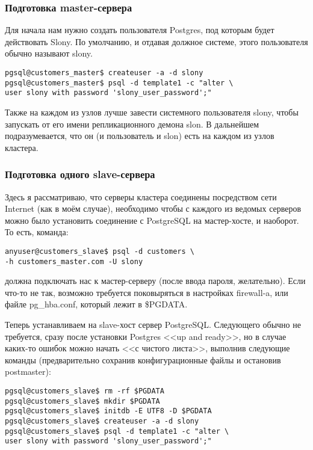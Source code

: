 \subsubsection{Подготовка master-сервера}
Для начала нам нужно создать пользователя Postgres, под которым будет действовать Slony. 
По умолчанию, и отдавая должное системе, этого пользователя обычно называют slony.
\begin{lstlisting}[label=lst:slony2,caption=Подготовка master-сервера]
pgsql@customers_master$ createuser -a -d slony
pgsql@customers_master$ psql -d template1 -c "alter \
user slony with password 'slony_user_password';"
\end{lstlisting}

Также на каждом из узлов лучше завести системного пользователя slony, чтобы запускать от его имени 
репликационного демона slon. В дальнейшем подразумевается, что он (и пользователь и slon) есть на 
каждом из узлов кластера. 

\subsubsection{Подготовка одного slave-сервера}
Здесь я рассматриваю, что серверы кластера соединены посредством сети Internet (как в моём случае), необходимо 
чтобы с каждого из ведомых серверов можно было установить соединение с PostgreSQL на мастер-хосте, и наоборот. 
То есть, команда:
\begin{lstlisting}[label=lst:slony3,caption=Подготовка одного slave-сервера]
anyuser@customers_slave$ psql -d customers \
-h customers_master.com -U slony
\end{lstlisting}

должна подключать нас к мастер-серверу (после ввода пароля, желательно). Если что-то не так, возможно требуется 
поковыряться в настройках firewall-a, или файле pg\_hba.conf, который лежит в \$PGDATA.

Теперь устанавливаем на slave-хост сервер PostgreSQL. Следующего обычно не требуется, сразу после установки Postgres 
<<up and ready>>, но в случае каких-то ошибок можно начать <<с чистого листа>>, выполнив следующие команды 
(предварительно сохранив конфигурационные файлы и остановив postmaster):
\begin{lstlisting}[label=lst:slony4,caption=Подготовка одного slave-сервера]
pgsql@customers_slave$ rm -rf $PGDATA
pgsql@customers_slave$ mkdir $PGDATA
pgsql@customers_slave$ initdb -E UTF8 -D $PGDATA
pgsql@customers_slave$ createuser -a -d slony
pgsql@customers_slave$ psql -d template1 -c "alter \
user slony with password 'slony_user_password';"
\end{lstlisting}

